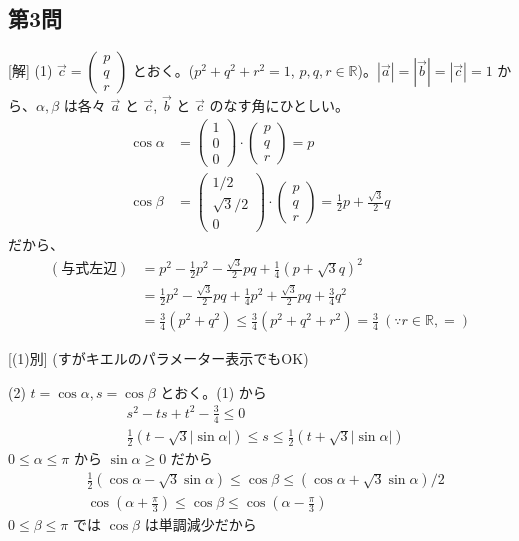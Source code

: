 \documentclass[../main.tex]{subfiles}
\begin{document}
\subsection*{第3問}
[解]
(1) $\vec{c} =
\begin{pmatrix} p \\ q \\ r
\end{pmatrix}$ とおく。($p^2+q^2+r^2=1$, $p,q,r \in \mathbb{R}$)。$|\vec{a}|=|\vec{b}|=|\vec{c}|=1$ から、$\alpha, \beta$ は各々 $\vec{a}$ と $\vec{c}$, $\vec{b}$ と $\vec{c}$ のなす角にひとしい。
\begin{align*}
  \cos\alpha &=
  \begin{pmatrix} 1 \\ 0 \\ 0
  \end{pmatrix} \cdot
  \begin{pmatrix} p \\ q \\ r
  \end{pmatrix} = p \\
  \cos\beta &=
  \begin{pmatrix} 1/2 \\ \sqrt{3}/2 \\ 0
  \end{pmatrix} \cdot
  \begin{pmatrix} p \\ q \\ r
  \end{pmatrix} = \frac{1}{2}p + \frac{\sqrt{3}}{2}q
\end{align*}
だから、
\begin{align*}
  (与式左辺) &= p^2 - \frac{1}{2}p^2 - \frac{\sqrt{3}}{2}pq + \frac{1}{4}(p+\sqrt{3}q)^2 \\
  &= \frac{1}{2}p^2 - \frac{\sqrt{3}}{2}pq + \frac{1}{4}p^2 + \frac{\sqrt{3}}{2}pq + \frac{3}{4}q^2 \\
  &= \frac{3}{4}(p^2+q^2) \le \frac{3}{4}(p^2+q^2+r^2) = \frac{3}{4} \ (\because r \in \mathbb{R}, =)
\end{align*}

[(1)別] (すがキエルのパラメーター表示でもOK)

(2) $t = \cos\alpha, s = \cos\beta$ とおく。(1) から
\begin{align*}
  &s^2 - ts + t^2 - \frac{3}{4} \le 0 \\
  &\frac{1}{2}(t - \sqrt{3}| \sin\alpha |) \le s \le \frac{1}{2}(t + \sqrt{3}| \sin\alpha |)
\end{align*}
$0 \le \alpha \le \pi$ から $\sin\alpha \ge 0$ だから
\begin{align*}
  &\frac{1}{2}(\cos\alpha - \sqrt{3}\sin\alpha) \le \cos\beta \le (\cos\alpha + \sqrt{3}\sin\alpha)/2 \\
  &\cos\left(\alpha + \frac{\pi}{3}\right) \le \cos\beta \le \cos\left(\alpha - \frac{\pi}{3}\right)
\end{align*}
$0 \le \beta \le \pi$ では $\cos\beta$ は単調減少だから
\end{document}
